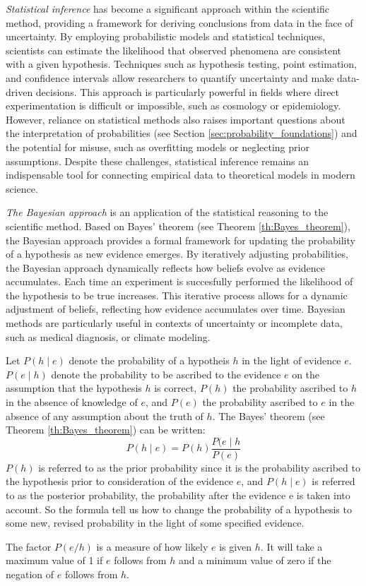 \emph{Statistical inference} has become a significant approach within the scientific method, providing a framework for deriving conclusions from data in the face of uncertainty. By employing probabilistic models and statistical techniques, scientists can estimate the likelihood that observed phenomena are consistent with a given hypothesis. Techniques such as hypothesis testing, point estimation, and confidence intervals allow researchers to quantify uncertainty and make data-driven decisions. This approach is particularly powerful in fields where direct experimentation is difficult or impossible, such as cosmology or epidemiology. However, reliance on statistical methods also raises important questions about the interpretation of probabilities (see Section \ref{sec:probability_foundations}) and the potential for misuse, such as overfitting models or neglecting prior assumptions. Despite these challenges, statistical inference remains an indispensable tool for connecting empirical data to theoretical models in modern science.

\emph{The Bayesian approach} is an application of the statistical reasoning to the scientific method. Based on Bayes' theorem (see Theorem \ref{th:Bayes_theorem}), the Bayesian approach provides a formal framework for updating the probability of a hypothesis as new evidence emerges. By iteratively adjusting probabilities, the Bayesian approach dynamically reflects how beliefs evolve as evidence accumulates. Each time an experiment is succesfully performed the likelihood of the hypothesis to be true increases. This iterative process allows for a dynamic adjustment of beliefs, reflecting how evidence accumulates over time. Bayesian methods are particularly useful in contexts of uncertainty or incomplete data, such as medical diagnosis, or climate modeling.

{\color{red}

Let $P(h \mid e)$ denote the probability of a hypotheis $h$ in the light of evidence $e$. $P(e \mid h)$ denote the probability to be ascribed to the evidence $e$ on the assumption that the hypothesis $h$ is correct, $P(h)$ the probability ascribed to $h$ in the absence of knowledge of $e$, and $P(e)$ the probability ascribed to $e$ in the absence of any assumption about the truth of $h$. The Bayes' theorem (see Theorem \ref{th:Bayes_theorem}) can be written:
\[
P(h \mid e) = P(h) \frac{P(e \mid h}{P(e)}
\]
$P(h)$ is referred to as the prior probability since it is the probability ascribed to the hypothesis prior to consideration of the evidence $e$, and $P(h \mid e)$ is referred to as the posterior probability, the probability after the evidence e is taken into account. So the formula tell us how to change the probability of a hypothesis to some new, revised probability in the light of some specified evidence.

The factor $P(e/h)$ is a measure of how likely $e$ is given $h$. It will take a maximum value of 1 if $e$ follows from $h$ and a minimum value of zero if the negation of $e$ follows from $h$.
}

